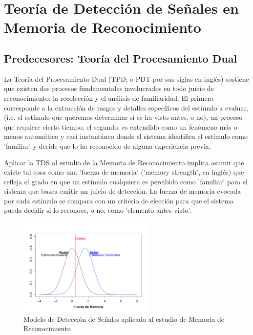 \section{Teoría de Detección de Señales en Memoria de Reconocimiento}

\subsection{Predecesores: Teoría del Procesamiento Dual}

La Teoría del Procesamiento Dual (TPD; o PDT por sus siglas en inglés) sostiene que existen dos procesos fundamentales involucrados en todo juicio de reconocimiento: la recolección y el análisis de familiaridad. El primero corresponde a la extracción de rasgos y detalles específicos del estímulo a evaluar, (i.e. el estímulo que queremos determinar si se ha visto antes, o no), un proceso que requiere cierto tiempo; el segundo, es entendido como un fenómeno más o menos automático y casi instantáneo donde el sistema identifica el estímulo como 'familiar' y decide que lo ha reconocido de alguna experiencia previa. 


Aplicar la TDS al estudio de la Memoria de Reconocimiento implica asumir que existe tal cosa como una 'fuerza de memoria' ('memory strength', en inglés) que refleja el grado en que un estímulo cualquiera es percibido como 'familiar' para el sistema que busca emitir un juicio de detección. La fuerza de memoria evocada por cada estímulo se compara con un criterio de elección para que el sistema pueda decidir si lo reconoce, o no, como 'elemento antes visto'.\\ 

\begin{figure}[th]
\centering
\includegraphics[width=0.60\textwidth]{Figures/RM_SDT_1} 
\decoRule
\caption[SDT en Memoria de Reconocimiento]{Modelo de Detección de Señales aplicado al estudio de Memoria de Reconocimiento}
\label{fig:RM_SDT_1}
\end{figure}

